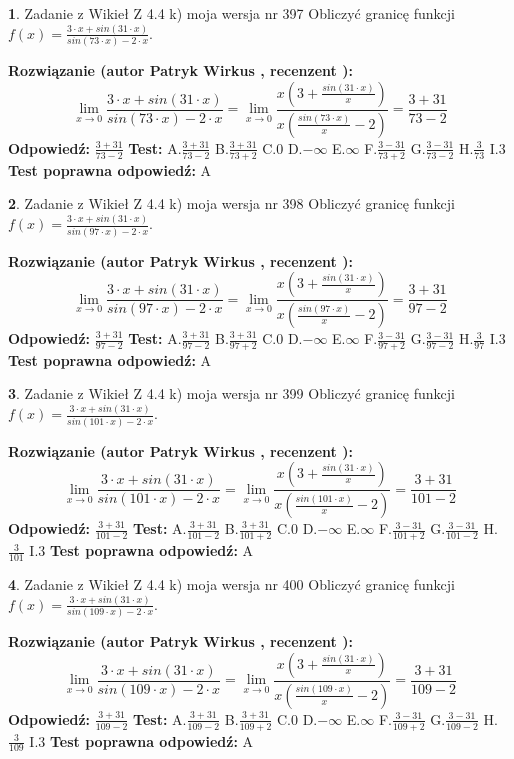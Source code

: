 \documentclass[12pt, a4paper]{article}
\theoremstyle{definition} %
\newtheorem{zad}{}
\newcommand{\zadStart}[1]{\begin{zad}#1\newline}
\newcommand{\zadStop}{\end{zad}}
\newcommand{\rozwStart}[2]{\noindent \textbf{Rozwiązanie (autor #1 , recenzent #2): }\newline}
\newcommand{\rozwStop}{\newline}
\newcommand{\odpStart}{\noindent \textbf{Odpowiedź:}\newline}
\newcommand{\odpStop}{\newline}
\newcommand{\testStart}{\noindent \textbf{Test:}\newline}
\newcommand{\testStop}{\newline}
\newcommand{\kluczStart}{\noindent \textbf{Test poprawna odpowiedź:}\newline}
\newcommand{\kluczStop}{\newline}
\begin{document}
\zadStart{Zadanie z Wikieł Z 4.4 k) moja wersja nr 397}
Obliczyć granicę funkcji $f(x)=\frac{3\cdot x +sin(31\cdot x)}{sin(73\cdot x) -2\cdot x}$.
\zadStop
\rozwStart{Patryk Wirkus}{}
$$\lim\limits_{x\to 0}\frac{3\cdot x +sin(31\cdot x)}{sin(73\cdot x) -2\cdot x}
=\lim\limits_{x\to 0}\frac{x(3+\frac{sin(31\cdot x)}{x})}{x(\frac{sin(73\cdot x)}{x}-2)}
=\frac{3+31}{73-2}$$
\rozwStop
\odpStart
$\frac{3+31}{73-2}$
\odpStop
\testStart
A.$\frac{3+31}{73-2}$
B.$\frac{3+31}{73+2}$
C.$0$
D.$-\infty$
E.$\infty$
F.$\frac{3-31}{73+2}$
G.$\frac{3-31}{73-2}$
H.$\frac{3}{73}$
I.$3$
\testStop
\kluczStart
A
\kluczStop



\zadStart{Zadanie z Wikieł Z 4.4 k) moja wersja nr 398}
Obliczyć granicę funkcji $f(x)=\frac{3\cdot x +sin(31\cdot x)}{sin(97\cdot x) -2\cdot x}$.
\zadStop
\rozwStart{Patryk Wirkus}{}
$$\lim\limits_{x\to 0}\frac{3\cdot x +sin(31\cdot x)}{sin(97\cdot x) -2\cdot x}
=\lim\limits_{x\to 0}\frac{x(3+\frac{sin(31\cdot x)}{x})}{x(\frac{sin(97\cdot x)}{x}-2)}
=\frac{3+31}{97-2}$$
\rozwStop
\odpStart
$\frac{3+31}{97-2}$
\odpStop
\testStart
A.$\frac{3+31}{97-2}$
B.$\frac{3+31}{97+2}$
C.$0$
D.$-\infty$
E.$\infty$
F.$\frac{3-31}{97+2}$
G.$\frac{3-31}{97-2}$
H.$\frac{3}{97}$
I.$3$
\testStop
\kluczStart
A
\kluczStop



\zadStart{Zadanie z Wikieł Z 4.4 k) moja wersja nr 399}
Obliczyć granicę funkcji $f(x)=\frac{3\cdot x +sin(31\cdot x)}{sin(101\cdot x) -2\cdot x}$.
\zadStop
\rozwStart{Patryk Wirkus}{}
$$\lim\limits_{x\to 0}\frac{3\cdot x +sin(31\cdot x)}{sin(101\cdot x) -2\cdot x}
=\lim\limits_{x\to 0}\frac{x(3+\frac{sin(31\cdot x)}{x})}{x(\frac{sin(101\cdot x)}{x}-2)}
=\frac{3+31}{101-2}$$
\rozwStop
\odpStart
$\frac{3+31}{101-2}$
\odpStop
\testStart
A.$\frac{3+31}{101-2}$
B.$\frac{3+31}{101+2}$
C.$0$
D.$-\infty$
E.$\infty$
F.$\frac{3-31}{101+2}$
G.$\frac{3-31}{101-2}$
H.$\frac{3}{101}$
I.$3$
\testStop
\kluczStart
A
\kluczStop



\zadStart{Zadanie z Wikieł Z 4.4 k) moja wersja nr 400}
Obliczyć granicę funkcji $f(x)=\frac{3\cdot x +sin(31\cdot x)}{sin(109\cdot x) -2\cdot x}$.
\zadStop
\rozwStart{Patryk Wirkus}{}
$$\lim\limits_{x\to 0}\frac{3\cdot x +sin(31\cdot x)}{sin(109\cdot x) -2\cdot x}
=\lim\limits_{x\to 0}\frac{x(3+\frac{sin(31\cdot x)}{x})}{x(\frac{sin(109\cdot x)}{x}-2)}
=\frac{3+31}{109-2}$$
\rozwStop
\odpStart
$\frac{3+31}{109-2}$
\odpStop
\testStart
A.$\frac{3+31}{109-2}$
B.$\frac{3+31}{109+2}$
C.$0$
D.$-\infty$
E.$\infty$
F.$\frac{3-31}{109+2}$
G.$\frac{3-31}{109-2}$
H.$\frac{3}{109}$
I.$3$
\testStop
\kluczStart
A
\kluczStop
\end{document}
